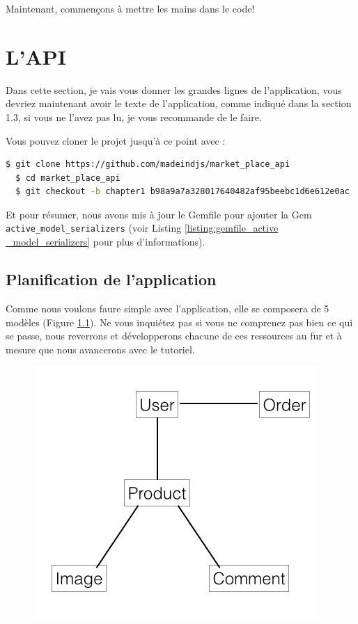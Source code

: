 \documentclass[]{report}
\begin{document}
    Maintenant, commençons à mettre les mains dans le code!

\chapter{L'API}

  Dans cette section, je vais vous donner les grandes lignes de l'application, vous devriez maintenant avoir le texte de l'application, comme indiqué dans la section 1.3, si vous ne l'avez pas lu, je vous recommande de le faire.

  Vous pouvez cloner le projet jusqu'à ce point avec :

  \begin{scriptsize}
  \begin{lstlisting}[language=bash, breaklines]
  $ git clone https://github.com/madeindjs/market_place_api
  $ cd market_place_api
  $ git checkout -b chapter1 b98a9a7a328017640482af95beebc1d6e612e0ac
  \end{lstlisting}
  \end{scriptsize}

  Et pour résumer, nous avons mis à jour le Gemfile pour ajouter la Gem \verb|active_model_serializers| (voir Listing \ref{listing:gemfile_active _model_serializers} pour plus d'informations).

  \section{Planification de l'application}

    Comme nous voulons faure simple avec l'application, elle se composera de 5 modèles (Figure \ref{fig:data_model}). Ne vous inquiétez pas si vous ne comprenez pas bien ce qui se passe, nous reverrons et développerons chacune de ces ressources au fur et à mesure que nous avancerons avec le tutoriel.

    \begin{figure}
      \includegraphics[width=\linewidth]{img/data_model.png}
      \label{fig:data_model}
    \end{figure}
\end{document}
